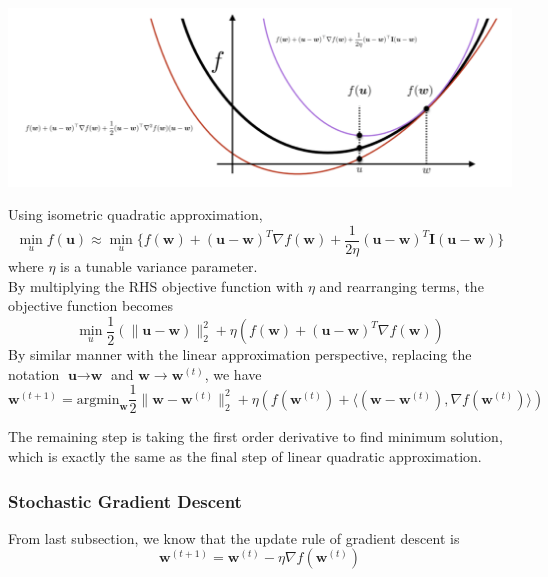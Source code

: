 \documentclass[11pt]{article}
\begin{document}
\begin{center}
    \includegraphics[scale=0.4]{images/gd_perspect3.png}
\end{center}

Using isometric quadratic approximation,
$$\min_u f(\textbf{u}) \approx \min_u \{f(\textbf{w}) + (\textbf{u} - \textbf{w})^T\nabla f(\textbf{w}) + \frac{1}{2\eta}(\textbf{u} - \textbf{w})^T\textbf{I}(\textbf{u} - \textbf{w})\}$$
where $\eta$ is a tunable variance parameter. \\
By multiplying the RHS objective function with $\eta$ and rearranging terms, the objective function becomes
$$\min_u \frac{1}{2}(\|\textbf{u} - \textbf{w})\|_2^2 + \eta(f(\textbf{w}) + (\textbf{u} - \textbf{w})^T\nabla f(\textbf{w}))$$
By similar manner with the linear approximation perspective, replacing the notation $\textbf{u} \rightarrow \textbf{w}$ and $\textbf{w} \rightarrow \textbf{w}^{(t)}$, we have
$$\textbf{w}^{(t+1)} = \text{argmin}_{\textbf{w}}\frac{1}{2}\|\textbf{w}  - \textbf{w}^{(t)}\|_2^2 + \eta(f(\textbf{w}^{(t)}) + \langle (\textbf{w} - \textbf{w}^{(t)}), \nabla f(\textbf{w}^{(t)}) \rangle)$$

The remaining step is taking the first order derivative to find minimum solution, which is exactly the same as the final step of linear quadratic approximation.

\subsubsection{Stochastic Gradient Descent}
From last subsection, we know that the update rule of gradient descent is 
$$\textbf{w}^{(t+1)} = \textbf{w}^{(t)} - \eta \nabla f(\textbf{w}^{(t)})$$
\end{document}
